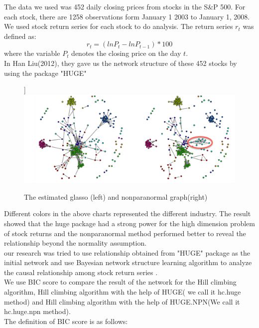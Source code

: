 \documentclass[12pt]{article}
\theoremstyle{plain}
\begin{document}
 The data we used was 452 daily closing prices from stocks in the S\&P 500. For each stock, there are 1258 observations form January 1 2003 to January 1, 2008.  We used stock return series for each stock to do analysis. The return series $r_t$ was defined as: \\
 \begin{equation}
r_t=(lnP_t-lnP_{t-1})*100
\end{equation}
where the variable $P_t$ denotes the closing price on the day $t$. \\

In Han Liu(2012), they gave us the network structure of these 452 stocks by using the package "HUGE"\\
\begin{figure}[!htb]]
\centering
\includegraphics[scale=0.50]{huge.png}
\caption{\label{graph:pdf1} The estimated glasso (left) and nonparanormal graph(right) }
\end{figure}



Different colors in the above charts represented the different industry. The result showed that the huge package had a strong power for the high dimension problem of stock returns and the nonparanormal method performed better to reveal the relationship beyond the normality assumption.\\
our research was tried to use relationship obtained from "HUGE" package as the initial network and use Bayesian network structure learning algorithm to analyze the causal relationship among stock return series .\\
We use BIC score to compare the result of the network for the Hill climbing algorithm, Hill climbing algorithm with the help of HUGE( we call it hc.huge method) and Hill climbing algorithm with the help of HUGE.NPN(We call it hc.huge.npn method).\\
The definition of BIC score is as follows: \\
\end{document}
